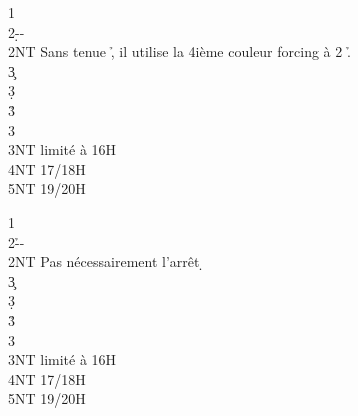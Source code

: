 \documentclass[a4paper]{article}
\begin{document}
\begin{bidtable}
1\c\\
2\d--\\
2NT \> Sans tenue \h , il utilise la 4ième couleur forcing à 2 \h .\+\\
3\c {}\\
3\d {}\\
3\h {}\\
3\s {}\\
3NT  limité à 16H\\
4NT  17/18H\\
5NT  19/20H\-
\end{bidtable}

\begin{bidtable}
1\c\\
2\h--\\
2NT \> Pas nécessairement l’arrêt \d \+\\
3\c {}\\
3\d {}\\
3\h {}\\
3\s {}\\
3NT  limité à 16H\\
4NT  17/18H\\
5NT  19/20H\-
\end{bidtable}
\end{document}

